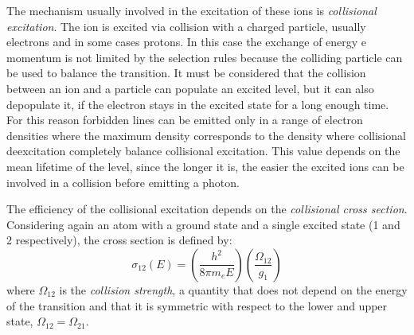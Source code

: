 \documentclass[../thesis.tex]{subfiles}
\begin{document}
The mechanism usually involved in the excitation of these ions is \emph{collisional excitation}.
The ion is excited via collision with a charged particle, usually electrons and in some cases protons.
In this case the exchange of energy e momentum is not limited by the selection rules because the colliding particle can be used to balance the transition.
It must be considered that the collision between an ion and a particle can populate an excited level, but it can also depopulate it, if the electron stays in the excited state for a long enough time.
For this reason forbidden lines can be emitted only in a range of electron densities where the maximum density corresponds to the density where collisional deexcitation completely balance collisional excitation.
This value depends on the mean lifetime of the level, since the longer it is, the easier the excited ions can be involved in a collision before emitting a photon.

The efficiency of the collisional excitation depends on the \emph{collisional cross section}.
Considering again an atom with a ground state and a single excited state (1 and 2 respectively), the cross section is defined by:
\begin{equation}
    \label{eq:crosssection}
    \sigma_{12}(E) = \left(\frac{h^2}{8\pi m_e E}\right)\left(\frac{\Omega_{12}}{g_1}\right)
\end{equation}
where $\Omega_{12}$ is the \emph{collision strength}, a quantity that does not depend on the energy of the transition and that it is symmetric with respect to the lower and upper state, $\Omega_{12} = \Omega_{21}$.
\end{document}

